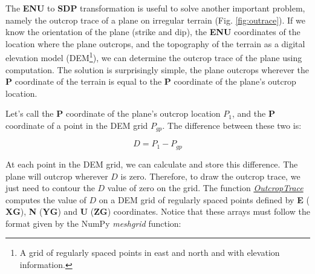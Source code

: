 \documentclass[a4paper , 12pt]{book}
\begin{document}
The \textbf{ENU} to \textbf{SDP} transformation is useful to solve another important problem, namely the outcrop trace of a plane on irregular terrain (Fig. \ref{fig:outrace}). If we know the orientation of the plane (strike and dip), the \textbf{ENU} coordinates of the location where the plane outcrops, and the topography of the terrain as a digital elevation model (DEM\footnote{A grid of regularly spaced points in east and north and with elevation information.}), we can determine the outcrop trace of the plane using computation. The solution is surprisingly simple, the plane outcrops wherever the \textbf{P} coordinate of the terrain is equal to the \textbf{P} coordinate of the plane's outcrop location.

Let's call the \textbf{P} coordinate of the plane's outcrop location $P_1$, and the \textbf{P} coordinate of a point in the DEM grid $P_{gp}$. The difference between these two is:

\begin{equation}
    D=P_1-P_{gp}
\end{equation}

At each point in the DEM grid, we can calculate and store this difference. The plane will outcrop wherever $D$ is zero. Therefore, to draw the outcrop trace, we just need to contour the $D$ value of zero on the grid. The function \href{https://github.com/nfcd/compGeo/blob/master/source/functions/OutcropTrace.py}{\textit{OutcropTrace}} computes the value of $D$ on a DEM grid of regularly spaced points defined by \textbf{E} ($\mathbf{XG}$), \textbf{N} ($\mathbf{YG}$) and \textbf{U} ($\mathbf{ZG}$) coordinates. Notice that these arrays must follow the format given by the NumPy \textit{meshgrid} function:
\end{document}
